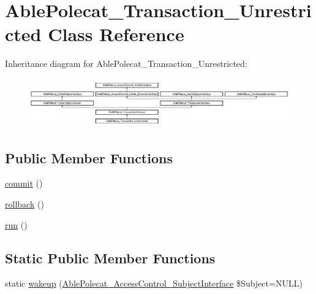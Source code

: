 \hypertarget{class_able_polecat___transaction___unrestricted}{}\section{Able\+Polecat\+\_\+\+Transaction\+\_\+\+Unrestricted Class Reference}
\label{class_able_polecat___transaction___unrestricted}
Inheritance diagram for Able\+Polecat\+\_\+\+Transaction\+\_\+\+Unrestricted\+:\begin{figure}[H]
\begin{center}
\leavevmode
\includegraphics[height=2.134146cm]{class_able_polecat___transaction___unrestricted}
\end{center}
\end{figure}
\subsection*{Public Member Functions}
\begin{DoxyCompactItemize}
\item 
\hyperlink{class_able_polecat___transaction___unrestricted_af5674c27d4a92f6228565010eacbb9cb}{commit} ()
\item 
\hyperlink{class_able_polecat___transaction___unrestricted_afa549adf79e3f8c09fe8f903dd5fbfa7}{rollback} ()
\item 
\hyperlink{class_able_polecat___transaction___unrestricted_afb0fafe7e02a3ae1993c01c19fad2bae}{run} ()
\end{DoxyCompactItemize}
\subsection*{Static Public Member Functions}
\begin{DoxyCompactItemize}
\item 
static \hyperlink{class_able_polecat___transaction___unrestricted_a3f2135f6ad45f51d075657f6d20db2cd}{wakeup} (\hyperlink{interface_able_polecat___access_control___subject_interface}{Able\+Polecat\+\_\+\+Access\+Control\+\_\+\+Subject\+Interface} \$Subject=N\+U\+L\+L)
\end{DoxyCompactItemize}
